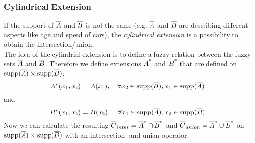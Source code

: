 \subsubsection*{Cylindrical Extension} \label{sec:cylindExt}
If the support of $\overline{A}$ and $\overline{B}$ is not the same (e.g. $\overline{A}$ and $\overline{B}$ are describing different aspects like age and speed of cars), the \emph{cylindrical extension} is a possibility to obtain the intersection/union:\\
The idea of the cylindrial extension is to define a fuzzy relation between the fuzzy sets $\overline{A}$ and $\overline{B}$. Therefore we define extensions $\overline{A}^*$ and $\overline{B}^*$ that are defined on $\operatorname{supp}(\overline{A})\times\operatorname{supp}(\overline{B})$:
\[ A^*(x_1,x_2) = A(x_1), \quad \forall x_2\in\operatorname{supp}(\overline{B}),x_1\in\operatorname{supp}(\overline{A}) \]
and
\[ B^*(x_1,x_2) = B(x_2), \quad \forall x_1\in\operatorname{supp}(\overline{A}),x_2\in\operatorname{supp}(\overline{B}) \]
Now we can calculate the resulting $\overline{C}_{inter} = \overline{A}^*\cap\overline{B}^*$ and $\overline{C}_{union} = \overline{A}^*\cup\overline{B}^*$ on $\operatorname{supp}(\overline{A})\times\operatorname{supp}(\overline{B})$ with an intersection- and union-operator.

